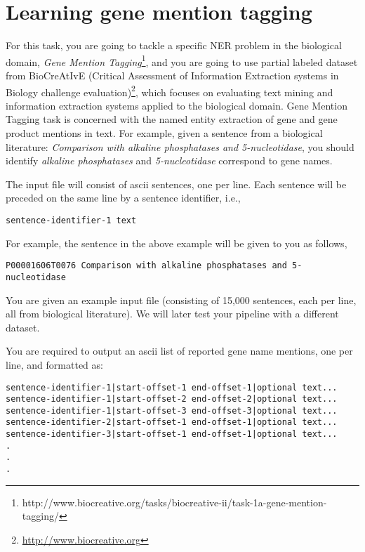 
\section{Learning gene mention tagging}

For this task, you are going to tackle a specific NER problem in the biological
domain, \emph{Gene Mention
Tagging}\footnote{http://www.biocreative.org/tasks/biocreative-ii/task-1a-gene-mention-tagging/},
and you are going to use partial labeled dataset from BioCreAtIvE (Critical
Assessment of Information Extraction systems in Biology challenge
evaluation)\footnote{\url{http://www.biocreative.org}}, which focuses on
evaluating text mining and information extraction systems applied to the
biological domain. Gene Mention Tagging task is concerned with the named entity
extraction of gene and gene product mentions in text. For example, given a
sentence from a biological literature: \emph{Comparison with alkaline
phosphatases and 5-nucleotidase}, you should identify \emph{alkaline
phosphatases} and \emph{5-nucleotidase} correspond to gene names.

The input file will consist of ascii sentences, one per line. Each sentence will
be preceded on the same line by a sentence identifier, i.e.,

\begin{verbatim}
sentence-identifier-1 text
\end{verbatim}

For example, the sentence in the above example will be given to you as follows,

\begin{verbatim}
P00001606T0076 Comparison with alkaline phosphatases and 5-nucleotidase
\end{verbatim}

You are given an example input file (consisting of 15,000 sentences, each per
line, all from biological literature). We will later test your pipeline with a
different dataset.

You are required to output an ascii list of reported gene name mentions, one per
line, and formatted as:

\begin{verbatim}
sentence-identifier-1|start-offset-1 end-offset-1|optional text... 
sentence-identifier-1|start-offset-2 end-offset-2|optional text... 
sentence-identifier-1|start-offset-3 end-offset-3|optional text... 
sentence-identifier-2|start-offset-1 end-offset-1|optional text... 
sentence-identifier-3|start-offset-1 end-offset-1|optional text... 
. 
. 
. 
\end{verbatim}

